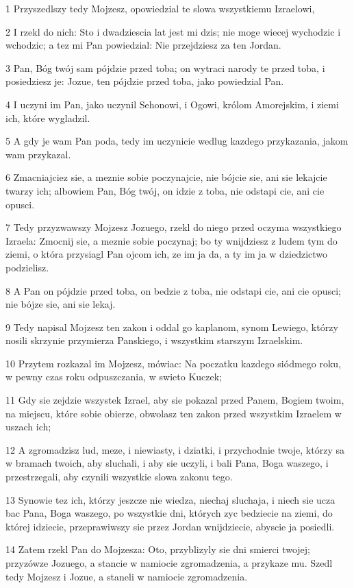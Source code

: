 \par 1 Przyszedlszy tedy Mojzesz, opowiedzial te slowa wszystkiemu Izraelowi,
\par 2 I rzekl do nich: Sto i dwadziescia lat jest mi dzis; nie moge wiecej wychodzic i wchodzic; a tez mi Pan powiedzial: Nie przejdziesz za ten Jordan.
\par 3 Pan, Bóg twój sam pójdzie przed toba; on wytraci narody te przed toba, i posiedziesz je: Jozue, ten pójdzie przed toba, jako powiedzial Pan.
\par 4 I uczyni im Pan, jako uczynil Sehonowi, i Ogowi, królom Amorejskim, i ziemi ich, które wygladzil.
\par 5 A gdy je wam Pan poda, tedy im uczynicie wedlug kazdego przykazania, jakom wam przykazal.
\par 6 Zmacniajciez sie, a meznie sobie poczynajcie, nie bójcie sie, ani sie lekajcie twarzy ich; albowiem Pan, Bóg twój, on idzie z toba, nie odstapi cie, ani cie opusci.
\par 7 Tedy przyzwawszy Mojzesz Jozuego, rzekl do niego przed oczyma wszystkiego Izraela: Zmocnij sie, a meznie sobie poczynaj; bo ty wnijdziesz z ludem tym do ziemi, o która przysiagl Pan ojcom ich, ze im ja da, a ty im ja w dziedzictwo podzielisz.
\par 8 A Pan on pójdzie przed toba, on bedzie z toba, nie odstapi cie, ani cie opusci; nie bójze sie, ani sie lekaj.
\par 9 Tedy napisal Mojzesz ten zakon i oddal go kaplanom, synom Lewiego, którzy nosili skrzynie przymierza Panskiego, i wszystkim starszym Izraelskim.
\par 10 Przytem rozkazal im Mojzesz, mówiac: Na poczatku kazdego siódmego roku, w pewny czas roku odpuszczania, w swieto Kuczek;
\par 11 Gdy sie zejdzie wszystek Izrael, aby sie pokazal przed Panem, Bogiem twoim, na miejscu, które sobie obierze, obwolasz ten zakon przed wszystkim Izraelem w uszach ich;
\par 12 A zgromadzisz lud, meze, i niewiasty, i dziatki, i przychodnie twoje, którzy sa w bramach twoich, aby sluchali, i aby sie uczyli, i bali Pana, Boga waszego, i przestrzegali, aby czynili wszystkie slowa zakonu tego.
\par 13 Synowie tez ich, którzy jeszcze nie wiedza, niechaj sluchaja, i niech sie ucza bac Pana, Boga waszego, po wszystkie dni, których zyc bedziecie na ziemi, do której idziecie, przeprawiwszy sie przez Jordan wnijdziecie, abyscie ja posiedli.
\par 14 Zatem rzekl Pan do Mojzesza: Oto, przyblizyly sie dni smierci twojej; przyzówze Jozuego, a stancie w namiocie zgromadzenia, a przykaze mu. Szedl tedy Mojzesz i Jozue, a staneli w namiocie zgromadzenia.
